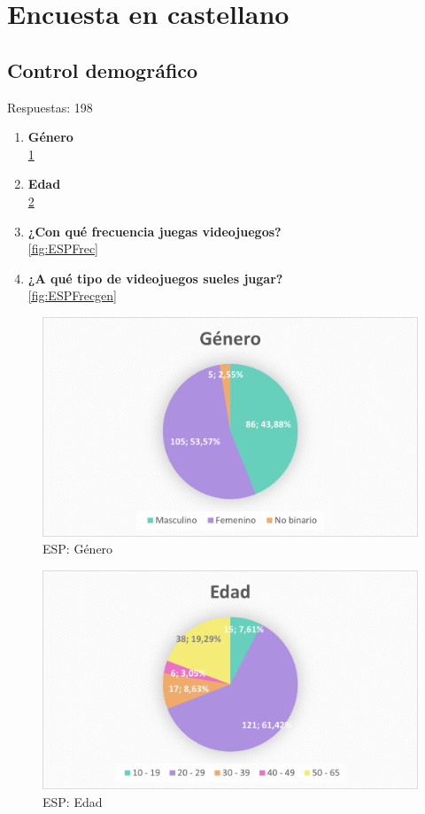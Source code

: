\documentclass[12pt, a4paper,twoside,titlepage]{book}
\begin{document}

\newpage
\section{Encuesta en castellano}



\subsection{Control demográfico}
Respuestas: 198
\begin{enumerate}[label=\textbf{\arabic*}.]
     \item \textbf{Género}\\
     \ref{fig:ESPGen}
     \item \textbf{Edad }\\
     \ref{fig:ESPEdad}
     \item \textbf{¿Con qué frecuencia juegas videojuegos?}\\
     \ref{fig:ESPFrec}
     \item \textbf{¿A qué tipo de videojuegos sueles jugar? }\\
     \ref{fig:ESPFrecgen}
\end{enumerate}


\begin{figure}
    \centering
    \includegraphics[width=.8\linewidth]{ANEXO ESP/1AnexESPGen}
    \caption{ESP: Género}
    \label{fig:ESPGen}
\end{figure}


\begin{figure}
    \centering
    \includegraphics[width=.8\linewidth]{ANEXO ESP/2AnexESP}
    \caption{ESP: Edad}
    \label{fig:ESPEdad}
\end{figure}
\end{document}
